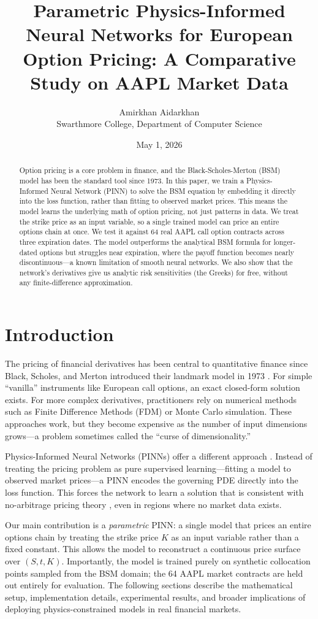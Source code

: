 \documentclass[11pt, twocolumn]{article}
\title{\textbf{Parametric Physics-Informed Neural Networks for European Option Pricing: A Comparative Study on AAPL Market Data}}
\author{Amirkhan Aidarkhan \\ Swarthmore College, Department of Computer Science}
\date{May 1, 2026}
\begin{document}
\maketitle

\begin{abstract}
Option pricing is a core problem in finance, and the Black-Scholes-Merton (BSM) model has been the standard tool since 1973. In this paper, we train a Physics-Informed Neural Network (PINN) to solve the BSM equation by embedding it directly into the loss function, rather than fitting to observed market prices. This means the model learns the underlying math of option pricing, not just patterns in data. We treat the strike price as an input variable, so a single trained model can price an entire options chain at once. We test it against 64 real AAPL call option contracts across three expiration dates. The model outperforms the analytical BSM formula for longer-dated options but struggles near expiration, where the payoff function becomes nearly discontinuous---a known limitation of smooth neural networks. We also show that the network's derivatives give us analytic risk sensitivities (the Greeks) for free, without any finite-difference approximation.
\end{abstract}

\section{Introduction}
The pricing of financial derivatives has been central to quantitative finance since Black, Scholes, and Merton introduced their landmark model in 1973 \cite{black1973pricing}. For simple ``vanilla'' instruments like European call options, an exact closed-form solution exists. For more complex derivatives, practitioners rely on numerical methods such as Finite Difference Methods (FDM) or Monte Carlo simulation. These approaches work, but they become expensive as the number of input dimensions grows—a problem sometimes called the ``curse of dimensionality.''

Physics-Informed Neural Networks (PINNs) offer a different approach \cite{raissi2019pinn}. Instead of treating the pricing problem as pure supervised learning—fitting a model to observed market prices—a PINN encodes the governing PDE directly into the loss function. This forces the network to learn a solution that is consistent with no-arbitrage pricing theory \cite{merton1973theory}, even in regions where no market data exists.

Our main contribution is a \textit{parametric} PINN: a single model that prices an entire options chain by treating the strike price $K$ as an input variable rather than a fixed constant. This allows the model to reconstruct a continuous price surface over $(S, t, K)$. Importantly, the model is trained purely on synthetic collocation points sampled from the BSM domain; the 64 AAPL market contracts are held out entirely for evaluation. The following sections describe the mathematical setup, implementation details, experimental results, and broader implications of deploying physics-constrained models in real financial markets.
\end{document}
